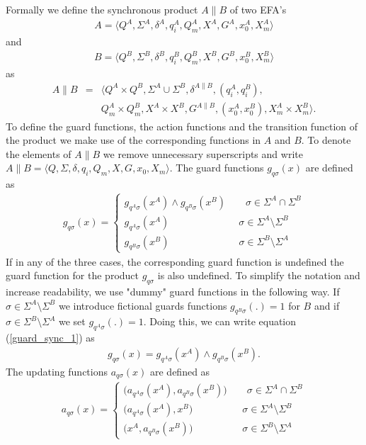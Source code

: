 \documentclass{article}
\begin{document}
Formally we define the synchronous product $A\|B$ of two EFA's
\begin{eqnarray}
A=\langle Q^A, \Sigma^A, \delta^A, q^A_i, Q^A_m, X^{A},
G^A,x^A_0,X^A_m \rangle
\end{eqnarray} and \begin{eqnarray} B=\langle Q^B, \Sigma^B, \delta^B, q^B_i,
Q^B_m, X^{B}, G^B,x^B_0,X^B_m \rangle
\end{eqnarray} as
\begin{eqnarray}
A\|B&=&\langle Q^A\times Q^B, \Sigma^A \cup \Sigma^B ,
\delta^{A\|B}, (q^A_i,q^B_i) ,\nonumber\\
&& Q^A_m\times Q^B_m, X^A \times X^B, G^{A\|B},(x^A_0,x^B_0),
X^A_m \times X^B_m \rangle.
\end{eqnarray}
To define the guard functions, the action functions and the
transition function of the product we make use of the
corresponding functions in $A$ and $B$. To denote the elements of
$A\|B$ we remove unnecessary  superscripts and write $A\|B=\langle
Q, \Sigma, \delta, q_i, Q_m, X, G ,x_0, X_m \rangle$. The guard
functions $g_{q \sigma}(x)$ are defined as
\begin{eqnarray}\label{guard_sync_1}
g_{q \sigma}(x)=\left\{
\begin{array}{ll}
g_{q^A\sigma}(x^{A})\wedge g_{q^B\sigma}(x^{B}) \quad\quad\sigma\in \Sigma^A \cap \Sigma^B\\
g_{q^A\sigma}(x^{A})\quad\quad\quad\quad\quad\quad\quad\sigma\in \Sigma^A\setminus\Sigma^B\\
g_{q^B\sigma}(x^{B})\quad\quad\quad\quad\quad\quad\quad\sigma\in\Sigma^B\setminus\Sigma^A
\end{array}\right.
\end{eqnarray}
If in any of the three cases, the corresponding guard function is
undefined the guard function for the product $g_{q \sigma}$ is
also undefined. To simplify the notation and increase readability,
we use "dummy" guard functions in the following way. If $\sigma\in
\Sigma^A \setminus \Sigma^B$ we introduce fictional guards
functions $g_{q^B\sigma}(.)=1$ for $B$ and if
$\sigma\in\Sigma^B\setminus \Sigma^A$ we set $g_{q^A\sigma}(.)=1$.
Doing this, we can write equation (\ref{guard_sync_1}) as
\begin{eqnarray}
g_{q \sigma}(x)= g_{q^A\sigma}(x^{A})\wedge g_{q^B\sigma}(x^{B}).
\end{eqnarray}
The updating functions $a_{q \sigma}(x)$ are defined as
\begin{eqnarray}\label{action_sync_1}
a_{q \sigma}(x)=\left\{
\begin{array}{ll}
 \big(a_{q^A \sigma}(x^{A}), a_{q^B \sigma}(x^{B})\big)\quad\quad\sigma\in \Sigma^A \cap \Sigma^B\\
\big(a_{q^A\sigma}(x^{A}),x^{B}\big)\quad\quad\quad\quad\quad\sigma\in\Sigma^A\setminus\Sigma^B\\
\big(x^{A},a_{q^B\sigma}(x^{B})\big)\quad\quad\quad\quad\quad\sigma\in\Sigma^B\setminus\Sigma^A
\end{array}\right.
\end{eqnarray}
\end{document}
